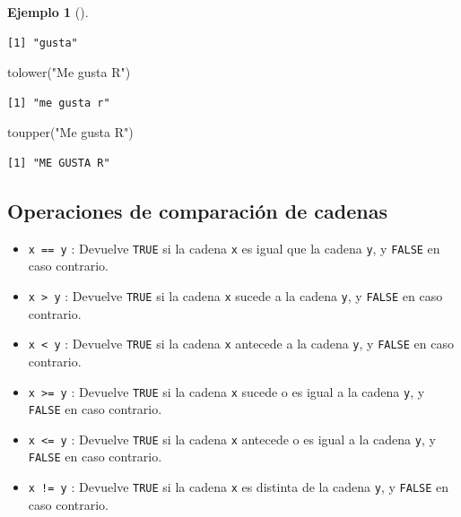 \documentclass[
  a4paper,
]{scrreport}
\newenvironment{Shaded}{\begin{snugshade}}{\end{snugshade}}
\newcommand{\FunctionTok}[1]{\textcolor[rgb]{0.28,0.35,0.67}{#1}}
\newcommand{\NormalTok}[1]{\textcolor[rgb]{0.00,0.23,0.31}{#1}}
\newcommand{\StringTok}[1]{\textcolor[rgb]{0.13,0.47,0.30}{#1}}
\providecommand{\tightlist}{%
  \setlength{\itemsep}{0pt}\setlength{\parskip}{0pt}}\usepackage{longtable,booktabs,array}
\theoremstyle{definition}
\theoremstyle{definition}
\newtheorem{example}{Ejemplo}[chapter]
\theoremstyle{remark}
\begin{document}
\begin{example}[]
\begin{verbatim}
[1] "gusta"
\end{verbatim}

\begin{Shaded}
\begin{Highlighting}[]
\FunctionTok{tolower}\NormalTok{(}\StringTok{"Me gusta R"}\NormalTok{)}
\end{Highlighting}
\end{Shaded}

\begin{verbatim}
[1] "me gusta r"
\end{verbatim}

\begin{Shaded}
\begin{Highlighting}[]
\FunctionTok{toupper}\NormalTok{(}\StringTok{"Me gusta R"}\NormalTok{)}
\end{Highlighting}
\end{Shaded}

\begin{verbatim}
[1] "ME GUSTA R"
\end{verbatim}

\end{example}

\hypertarget{operaciones-de-comparaciuxf3n-de-cadenas}{%
\subsection{Operaciones de comparación de
cadenas}\label{operaciones-de-comparaciuxf3n-de-cadenas}}

\begin{itemize}
\tightlist
\item
  \texttt{x\ ==\ y} : Devuelve \texttt{TRUE} si la cadena \texttt{x} es
  igual que la cadena \texttt{y}, y \texttt{FALSE} en caso contrario.
\item
  \texttt{x\ \textgreater{}\ y} : Devuelve \texttt{TRUE} si la cadena
  \texttt{x} sucede a la cadena \texttt{y}, y \texttt{FALSE} en caso
  contrario.
\item
  \texttt{x\ \textless{}\ y} : Devuelve \texttt{TRUE} si la cadena
  \texttt{x} antecede a la cadena \texttt{y}, y \texttt{FALSE} en caso
  contrario.
\item
  \texttt{x\ \textgreater{}=\ y} : Devuelve \texttt{TRUE} si la cadena
  \texttt{x} sucede o es igual a la cadena \texttt{y}, y \texttt{FALSE}
  en caso contrario.
\item
  \texttt{x\ \textless{}=\ y} : Devuelve \texttt{TRUE} si la cadena
  \texttt{x} antecede o es igual a la cadena \texttt{y}, y
  \texttt{FALSE} en caso contrario.
\item
  \texttt{x\ !=\ y} : Devuelve \texttt{TRUE} si la cadena \texttt{x} es
  distinta de la cadena \texttt{y}, y \texttt{FALSE} en caso contrario.
\end{itemize}
\end{document}

